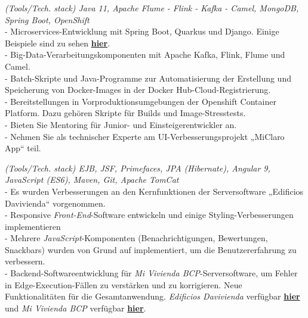 \documentclass[]{CV-JuanCamiloFlorez}
\begin{document}
\begin{minipage}[t]{0.66\textwidth}
    \textit{(Tools/Tech. stack) Java 11, Apache Flume - Flink - Kafka - Camel, MongoDB, Spring Boot, OpenShift} \\
        - Microservices-Entwicklung mit Spring Boot, Quarkus und Django. Einige Beispiele sind zu sehen \textbf{\href{https://github.com/VanJFlorez/flink-kafka-fraud-detection}{hier}}. \\
        - Big-Data-Verarbeitungskomponenten mit Apache Kafka, Flink, Flume und Camel. \\
        - Batch-Skripte und Java-Programme zur Automatisierung der Erstellung und Speicherung von Docker-Images in der Docker Hub-Cloud-Registrierung. \\
        - Bereitstellungen in Vorproduktionsumgebungen der Openshift Container Platform. Dazu gehören Skripte für Builds und Image-Stresstests. \\
        - Bieten Sie Mentoring für Junior- und Einsteigerentwickler an. \\
        - Nehmen Sie als technischer Experte am UI-Verbesserungsprojekt „MiClaro App“ teil. \\
        \sectionsep

    \textit{(Tools/Tech. stack) EJB, JSF, Primefaces, JPA (Hibernate), Angular 9, JavaScript (ES6), Maven, Git, Apache TomCat} \\
        - Es wurden Verbesserungen an den Kernfunktionen der Serversoftware „Edificios Davivienda“ vorgenommen. \\
        - Responsive \textit{Front-End}-Software entwickeln und einige Styling-Verbesserungen implementieren \\
        - Mehrere \textit{JavaScript}-Komponenten (Benachrichtigungen, Bewertungen, Snackbars) wurden von Grund auf implementiert, um die Benutzererfahrung zu verbessern. \\
        - Backend-Softwareentwicklung für \textit{Mi Vivienda BCP}-Serversoftware, um Fehler in Edge-Execution-Fällen zu verstärken und zu korrigieren. Neue Funktionalitäten für die Gesamtanwendung. \textit{Edificios Davivienda} verfügbar \textbf{\href{https://www.edificiosdavivienda.com}{hier}} und \textit{Mi Vivienda BCP} verfügbar \textbf{\href{https://www.miviviendabcp.com.bo}{hier}}. \\
        \sectionsep


\end{minipage}
\end{document}
